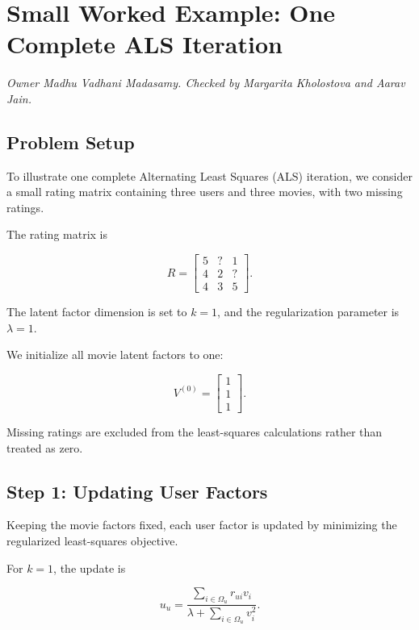 

\section{Small Worked Example: One Complete ALS Iteration}
\textit{Owner Madhu Vadhani Madasamy. Checked by Margarita Kholostova and Aarav Jain.}

\subsection{Problem Setup}

To illustrate one complete Alternating Least Squares (ALS)
iteration, we consider a small rating matrix containing three
users and three movies, with two missing ratings.

The rating matrix is

\[
R =
\begin{bmatrix}
5 & ? & 1\\
4 & 2 & ?\\
4 & 3 & 5
\end{bmatrix}.
\]

The latent factor dimension is set to $k=1$, and the
regularization parameter is $\lambda=1$.

We initialize all movie latent factors to one:

\[
V^{(0)} =
\begin{bmatrix}
1\\
1\\
1
\end{bmatrix}.
\]

Missing ratings are excluded from the least-squares
calculations rather than treated as zero.

\subsection{Step 1: Updating User Factors}

Keeping the movie factors fixed, each user factor is
updated by minimizing the regularized least-squares
objective.

For $k=1$, the update is

\[
u_u =
\frac{\displaystyle\sum_{i\in\Omega_u}r_{ui}v_i}
{\displaystyle\lambda+
\sum_{i\in\Omega_u}v_i^2}.
\]

